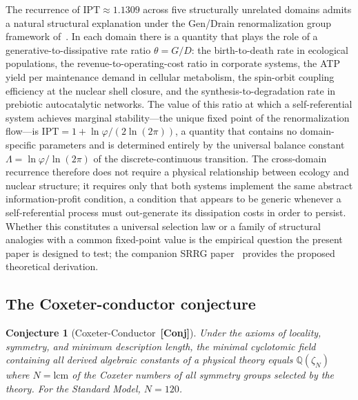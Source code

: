\documentclass[11pt]{article}
\newtheorem{conjecture}[theorem]{Conjecture}
\theoremstyle{remark}
\newcommand{\IPT}{\mathrm{IPT}}
\newcommand{\zetaN}[1]{\zeta_{#1}}
\begin{document}
The recurrence of $\IPT \approx 1.1309$ across five structurally unrelated domains admits a natural structural explanation under the Gen/Drain renormalization group framework of~\cite{SpivackIPT,SpivackSRRG}. In each domain there is a quantity that plays the role of a generative-to-dissipative rate ratio $\theta = G/D$: the birth-to-death rate in ecological populations, the revenue-to-operating-cost ratio in corporate systems, the ATP yield per maintenance demand in cellular metabolism, the spin-orbit coupling efficiency at the nuclear shell closure, and the synthesis-to-degradation rate in prebiotic autocatalytic networks. The value of this ratio at which a self-referential system achieves marginal stability---the unique fixed point of the renormalization flow---is $\IPT = 1 + \ln\varphi/(2\ln(2\pi))$, a quantity that contains no domain-specific parameters and is determined entirely by the universal balance constant $\Lambda = \ln\varphi/\ln(2\pi)$ of the discrete-continuous transition. The cross-domain recurrence therefore does not require a physical relationship between ecology and nuclear structure; it requires only that both systems implement the same abstract information-profit condition, a condition that appears to be generic whenever a self-referential process must out-generate its dissipation costs in order to persist. Whether this constitutes a universal selection law or a family of structural analogies with a common fixed-point value is the empirical question the present paper is designed to test; the companion SRRG paper~\cite{SpivackSRRG} provides the proposed theoretical derivation.

\subsection{The Coxeter-conductor conjecture}

\begin{conjecture}[Coxeter-Conductor~\textbf{[Conj]}]
Under the axioms of locality, symmetry, and minimum description length, the minimal
cyclotomic field containing all derived algebraic constants of a physical theory
equals $\mathbb{Q}(\zetaN{N})$ where $N = \mathrm{lcm}$ of the Coxeter numbers of
all symmetry groups selected by the theory.
For the Standard Model, $N = 120$.
\end{conjecture}
\end{document}
